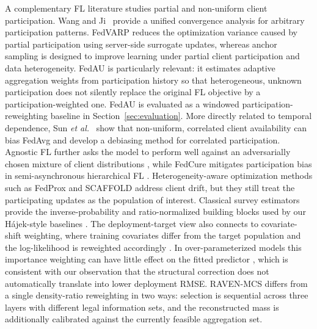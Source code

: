 \documentclass[letterpaper,journal]{IEEEtran}
\begin{document}
A complementary FL literature studies partial and non-uniform client
participation.  Wang and Ji~\cite{wang2022unified} provide a unified convergence
analysis for arbitrary participation patterns.  FedVARP
\cite{jhunjhunwala2022fedvarp} reduces the optimization variance caused by
partial participation using server-side surrogate updates, whereas anchor
sampling \cite{wu2023anchor} is designed to improve learning under partial
client participation and data heterogeneity.  FedAU
\cite{wang2024lightweight} is particularly relevant: it estimates adaptive
aggregation weights from participation history so that heterogeneous,
unknown participation does not silently replace the original FL objective by
a participation-weighted one.  FedAU is evaluated as a windowed participation-reweighting baseline in Section~\ref{sec:evaluation}.  More directly related to temporal dependence,
Sun \emph{et al.}~\cite{sun2025debiasing} show that non-uniform, correlated
client availability can bias FedAvg and develop a debiasing method for
correlated participation.  Agnostic FL further asks the model to perform well
against an adversarially chosen mixture of client distributions
\cite{mohri2019agnostic}, while FedCure mitigates participation bias in
semi-asynchronous hierarchical FL \cite{chen2026fedcure}.  Heterogeneity-aware
optimization methods such as FedProx and SCAFFOLD
\cite{li2020fedprox,karimireddy2020scaffold} address client drift, but they
still treat the participating updates as the population of interest.
Classical survey estimators provide the inverse-probability and ratio-normalized
building blocks used by our H\'ajek-style baselines
\cite{horvitz1952generalization,hajek1971comment}.  The deployment-target view
also connects to covariate-shift weighting, where training covariates differ
from the target population and the log-likelihood is reweighted accordingly
\cite{shimodaira2000improving}.  In over-parameterized models this importance
weighting can have little effect on the fitted predictor
\cite{byrd2019what}, which is consistent with our observation that the
structural correction does not automatically translate into lower deployment
RMSE.  RAVEN-MCS differs from a single density-ratio reweighting in two ways:
selection is sequential across three layers with different legal information
sets, and the reconstructed mass is additionally calibrated against the
currently feasible aggregation set.
\end{document}
